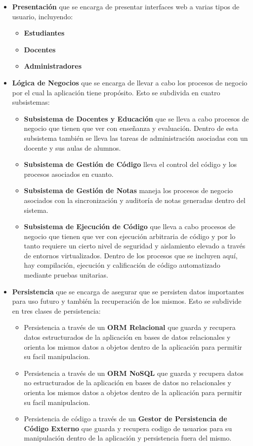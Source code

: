 \begin{itemize}
\begin{itemize}
    \end{itemize}
    \item \textbf{Presentación} que se encarga de presentar interfaces web a varias tipos de usuario, incluyendo:
    \begin{itemize}
    	\item \textbf{Estudiantes}
		\item \textbf{Docentes}
		\item \textbf{Administradores}
    \end{itemize}
    \item \textbf{Lógica de Negocios} que se encarga de llevar a cabo los procesos de negocio por el cual la aplicación tiene propósito. Esto se subdivida en cuatro subsistemas:
    \begin{itemize}
    	\item \textbf{Subsistema de Docentes y Educación} que se lleva a cabo procesos de negocio que tienen que ver con enseñanza y evaluación. Dentro de esta subsistema también se lleva las tareas de administración asociadas con un docente y sus aulas de alumnos.
        \item \textbf{Subsistema de Gestión de Código} lleva el control del código y los procesos asociados en cuanto.
        \item \textbf{Subsistema de Gestión de Notas} maneja los procesos de negocio asociados con la sincronización y auditoría de notas generadas dentro del sistema.
        \item \textbf{Subsistema de Ejecución de Código} que lleva a cabo procesos de negocio que tienen que ver con ejecución arbitraria de código y por lo tanto requiere un cierto nivel de seguridad y aislamiento elevado a través de entornos virtualizados. Dentro de los procesos que se incluyen aquí, hay compilación, ejecución y calificación de código automatizado mediante pruebas unitarias.
    \end{itemize}
    \item \textbf{Persistencia} que se encarga de asegurar que se persisten datos importantes para uso futuro y también la recuperación de los mismos. Esto se subdivide en tres clases de persistencia:
    \begin{itemize}
    	\item Persistencia a través de un \textbf{ORM Relacional} que guarda y recupera datos estructurados de la aplicación en bases de datos relacionales y orienta los mismos datos a objetos dentro de la aplicación para permitir su facil manipulacion.
        \item Persistencia a través de un \textbf{ORM NoSQL} que guarda y recupera datos no estructurados de la aplicación en bases de datos no relacionales y orienta los mismos datos a objetos dentro de la aplicación para permitir su facil manipulacion.
        \item Persistencia de código a través de un \textbf{Gestor de Persistencia de Código Externo} que guarda y recupera codigo de usuarios para su manipulación dentro de la aplicación y persistencia fuera del mismo.
    \end{itemize}
\end{itemize}

